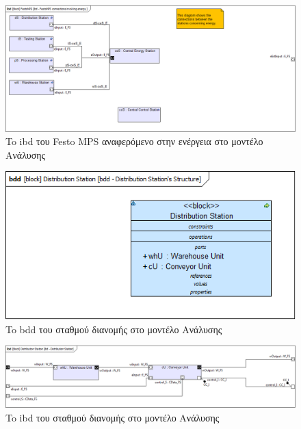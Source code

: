 \documentclass[a4paper,12pt,twoside]{report}
\begin{document}
\begin{appendices}
			\begin{figure}[hp]
					\centering
					\includegraphics[scale=0.30]{AnalysisModel_ibd-FestoMPSconnectionsinvolvingenergy.png}
					\caption{To ibd του Festo MPS αναφερόμενο στην ενέργεια στο μοντέλο Ανάλυσης}
					\label{φωτ:To ibd του Festo MPS αναφερόμενο στην ενέργεια στο μοντέλο Ανάλυσης}
			\end{figure}
			
			\begin{figure}[hp]
					\centering
					\includegraphics[scale=0.30]{AnalysisModel_bdd-DistributionStationsStructure.png}
					\caption{To bdd του σταθμού διανομής στο μοντέλο Ανάλυσης}
					\label{φωτ:To bdd του σταθμού διανομής στο μοντέλο Ανάλυσης}
			\end{figure}
			
			\begin{figure}[hp]
					\centering
					\includegraphics[scale=0.30]{AnalysisModel_ibd-DistributionStation.png}
					\caption{To ibd του σταθμού διανομής στο μοντέλο Ανάλυσης}
					\label{φωτ:To ibd του σταθμού διανομής στο μοντέλο Ανάλυσης}
			\end{figure}
			

\end{appendices}
\end{document}

